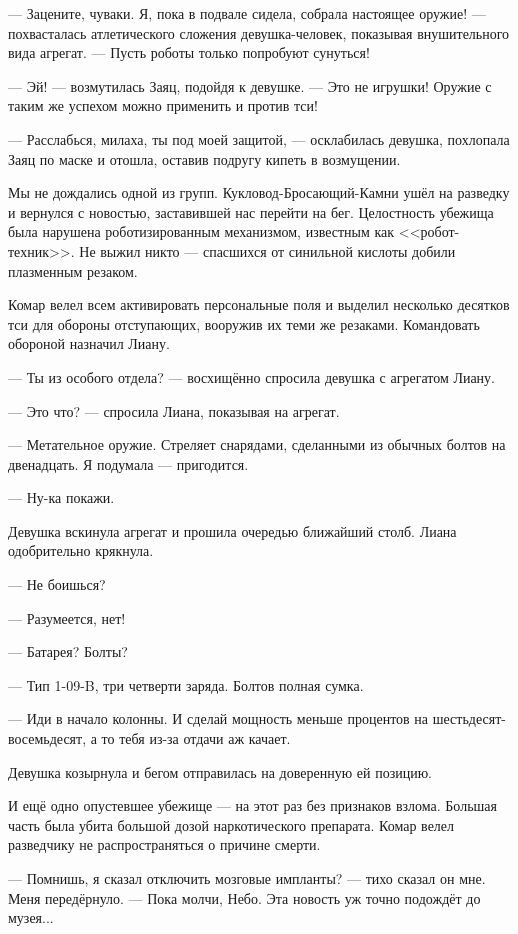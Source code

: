 --- Зацените, чуваки.
Я, пока в подвале сидела, собрала настоящее оружие! --- похвасталась атлетического сложения девушка-человек, показывая внушительного вида агрегат.
--- Пусть роботы только попробуют сунуться!

--- Эй! --- возмутилась Заяц, подойдя к девушке.
--- Это не игрушки!
Оружие с таким же успехом можно применить и против тси!

--- Расслабься, милаха, ты под моей защитой, --- осклабилась девушка, похлопала Заяц по маске и отошла, оставив подругу кипеть в возмущении.

Мы не дождались одной из групп.
Кукловод-Бросающий-Камни ушёл на разведку и вернулся с новостью, заставившей нас перейти на бег.
Целостность убежища была нарушена роботизированным механизмом, известным как <<робот-техник>>.
Не выжил никто --- спасшихся от синильной кислоты добили плазменным резаком.

Комар велел всем активировать персональные поля и выделил несколько десятков тси для обороны отступающих, вооружив их теми же резаками.
Командовать обороной назначил Лиану.

--- Ты из особого отдела? --- восхищённо спросила девушка с агрегатом Лиану.

--- Это что? --- спросила Лиана, показывая на агрегат.

--- Метательное оружие.
Стреляет снарядами, сделанными из обычных болтов на двенадцать.
Я подумала --- пригодится.

--- Ну-ка покажи.

Девушка вскинула агрегат и прошила очередью ближайший столб.
Лиана одобрительно крякнула.

--- Не боишься?

--- Разумеется, нет!

--- Батарея?
Болты?

--- Тип 1-09-B, три четверти заряда.
Болтов полная сумка.

--- Иди в начало колонны.
И сделай мощность меньше процентов на шестьдесят-восемьдесят, а то тебя из-за отдачи аж качает.

Девушка козырнула и бегом отправилась на доверенную ей позицию.

И ещё одно опустевшее убежище --- на этот раз без признаков взлома.
Большая часть была убита большой дозой наркотического препарата.
Комар велел разведчику не распространяться о причине смерти.

--- Помнишь, я сказал отключить мозговые импланты? --- тихо сказал он мне.
Меня передёрнуло.
--- Пока молчи, Небо.
Эта новость уж точно подождёт до музея...

